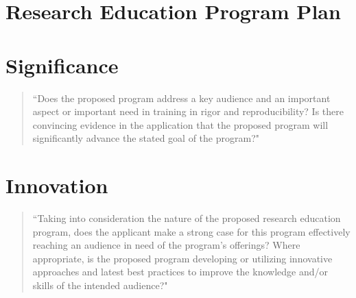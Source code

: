 \documentclass[pdftex,english,11pt,parskip=half]{scrartcl}
\begin{document}
\endgroup

\clearpage

\section*{Research Education Program Plan}

\section{Significance}
\vspace{-0.1in}

\begin{quotation}
``Does the proposed program address a key audience and an important aspect or important need in training in rigor and reproducibility? Is there convincing evidence in the application that the proposed program will significantly advance the stated goal of the program?"
\end{quotation}

\section{Innovation}
\vspace{-0.1in}

\begin{quotation}
``Taking into consideration the nature of the proposed research education program, does the applicant make a strong case for this program effectively reaching an audience in need of the program's offerings? Where appropriate, is the proposed program developing or utilizing innovative approaches and latest best practices to improve the knowledge and/or skills of the intended audience?"
\end{quotation}
\end{document}
